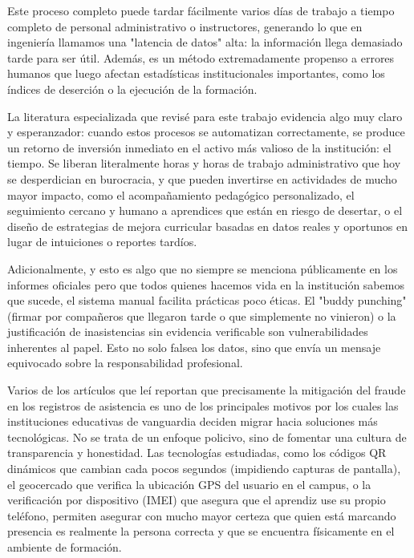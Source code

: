 Este proceso completo puede tardar fácilmente varios días de trabajo a tiempo completo de personal administrativo o instructores, generando lo que en ingeniería llamamos una "latencia de datos" alta: la información llega demasiado tarde para ser útil. Además, es un método extremadamente propenso a errores humanos que luego afectan estadísticas institucionales importantes, como los índices de deserción o la ejecución de la formación.

La literatura especializada que revisé para este trabajo evidencia algo muy claro y esperanzador: cuando estos procesos se automatizan correctamente, se produce un retorno de inversión inmediato en el activo más valioso de la institución: el tiempo. Se liberan literalmente horas y horas de trabajo administrativo que hoy se desperdician en burocracia, y que pueden invertirse en actividades de mucho mayor impacto, como el acompañamiento pedagógico personalizado, el seguimiento cercano y humano a aprendices que están en riesgo de desertar, o el diseño de estrategias de mejora curricular basadas en datos reales y oportunos en lugar de intuiciones o reportes tardíos.

Adicionalmente, y esto es algo que no siempre se menciona públicamente en los informes oficiales pero que todos quienes hacemos vida en la institución sabemos que sucede, el sistema manual facilita prácticas poco éticas. El "buddy punching" (firmar por compañeros que llegaron tarde o que simplemente no vinieron) o la justificación de inasistencias sin evidencia verificable son vulnerabilidades inherentes al papel. Esto no solo falsea los datos, sino que envía un mensaje equivocado sobre la responsabilidad profesional.

Varios de los artículos que leí reportan que precisamente la mitigación del fraude en los registros de asistencia es uno de los principales motivos por los cuales las instituciones educativas de vanguardia deciden migrar hacia soluciones más tecnológicas. No se trata de un enfoque policivo, sino de fomentar una cultura de transparencia y honestidad. Las tecnologías estudiadas, como los códigos QR dinámicos que cambian cada pocos segundos (impidiendo capturas de pantalla), el geocercado que verifica la ubicación GPS del usuario en el campus, o la verificación por dispositivo (IMEI) que asegura que el aprendiz use su propio teléfono, permiten asegurar con mucho mayor certeza que quien está marcando presencia es realmente la persona correcta y que se encuentra físicamente en el ambiente de formación.

